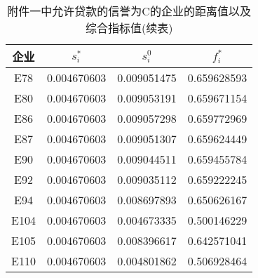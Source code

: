 \documentclass{cumcmthesis}
\begin{document}
\begin{appendices}
\begin{table}[H]   %
	\caption{附件一中允许贷款的信誉为C的企业的距离值以及综合指标值(续表)}\label{tab:015} \centering
	\begin{tabular}{cccc}
		\toprule[1.5pt]
		企业 & $s_i^*$    & $s_i^0$        & $f_i^*$         \\
		\midrule[1pt]
E78 & 0.004670603 & 0.009051475 & 0.659628593 \\ 
E80 & 0.004670603 & 0.009053191 & 0.659671154 \\ 
E86 & 0.004670603 & 0.009057298 & 0.659772969 \\ 
E87 & 0.004670603 & 0.009051307 & 0.659624449 \\ 
E90 & 0.004670603 & 0.009044511 & 0.659455784 \\ 
E92 & 0.004670603 & 0.009035112 & 0.659222245 \\ 
E94 & 0.004670603 & 0.008697893 & 0.650626167 \\ 
E104 & 0.004670603 & 0.004673335 & 0.500146229 \\ 
E105 & 0.004670603 & 0.008396617 & 0.642571041 \\ 
E110 & 0.004670603 & 0.004801862 & 0.506928464 \\ 
		\bottomrule[1.5pt]
	\end{tabular}
\end{table}


\end{appendices}
\end{document}
